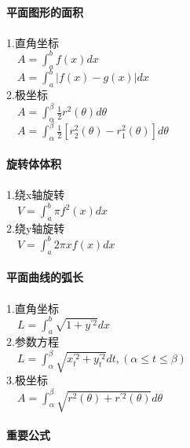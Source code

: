\documentclass{article}
\begin{document}
\begin{flushleft}
	\fontsize{24pt}{30pt}\selectfont
	
	~\\ \textbf{平面图形的面积} \\~\\
	
	1.直角坐标\\
	\ \ $A=\int_{a}^{b}f(x)dx$\\
	\ \ $A=\int_{a}^{b}|f(x)-g(x)|dx$\\
	2.极坐标\\
	\ \ $A=\int_{\alpha}^{\beta}\frac{1}{2}r^2(\theta)d\theta$\\
	\ \ $A=\int_{\alpha}^{\beta}\frac{1}{2}[r_2^2(\theta)-r_1^2(\theta)]d\theta$\\
	
	~\\ \textbf{旋转体体积} \\~\\
	
	1.绕x轴旋转\\
	\ \ $V=\int_{a}^{b}\pi f^2(x)dx$\\
	2.绕y轴旋转\\
	\ \ $V=\int_{a}^{b}2\pi xf(x)dx$\\
	
	~\\ \textbf{平面曲线的弧长} \\~\\
	
	1.直角坐标\\
	\ \ $L=\int_{a}^{b}\sqrt{1+y^{'2}}dx$\\
	2.参数方程\\
	\ \ $L=\int_{\alpha}^{\beta}\sqrt{x_t^{'2}+y_t^{'2}}dt, (\alpha \le t \le \beta)$\\
	3.极坐标\\
	\ \ $A=\int_{\alpha}^{\beta}\sqrt{r^2(\theta)+r^{'2}(\theta)}d\theta$\\
	
	~\\ \textbf{重要公式} \\~\\
	

\end{flushleft}
\end{document}
